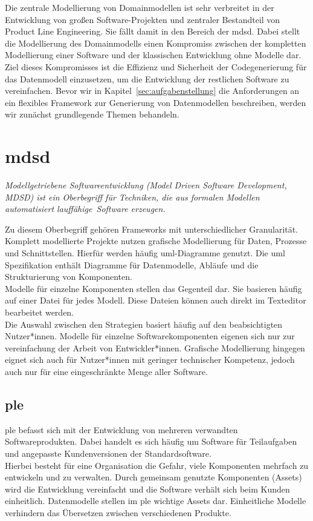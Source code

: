\documentclass[./einleitung.tex]{subfiles}
\begin{document}
Die zentrale Modellierung von Domainmodellen ist sehr verbreitet in der Entwicklung von großen Software-Projekten und zentraler Bestandteil von Product Line Engineering.
Sie fällt damit in den Bereich der \acrfull{mdsd}.
Dabei stellt die Modellierung des Domainmodells einen Kompromiss zwischen der kompletten Modellierung einer Software und der klassischen Entwicklung ohne Modelle dar. \\
Ziel dieses Kompromisses ist die Effizienz und Sicherheit der Codegenerierung für das Datenmodell einzusetzen, um die Entwicklung der restlichen Software zu vereinfachen.
Bevor wir in Kapitel~\ref{sec:aufgabenstellung} die Anforderungen an ein flexibles Framework zur Generierung von Datenmodellen beschreiben, werden wir zunächst grundlegende Themen behandeln.
\section{\acrfull{mdsd}}\label{subsec:mdsd}
\begin{center}
    \textit{Modellgetriebene Softwareentwicklung (Model Driven Software Development, MDSD) ist ein Oberbegriff für Techniken, die aus formalen Modellen automatisiert lauffähige~Software erzeugen.} \cite[p. 11]{modellbuch}
\end{center}
Zu diesem Oberbegriff gehören Frameworks mit unterschiedlicher Granularität.
Komplett modellierte Projekte nutzen grafische Modellierung für Daten, Prozesse und Schnittstellen.
Hierfür werden häufig \acrshort{uml}-Diagramme genutzt.
Die \acrshort{uml} Spezifikation enthält Diagramme für Datenmodelle, Abläufe und die Strukturierung von Komponenten.\\
Modelle für einzelne Komponenten stellen das Gegenteil dar.
Sie basieren häufig auf einer Datei für jedes Modell.
Diese Dateien können auch direkt im Texteditor bearbeitet werden.\\
Die Auswahl zwischen den Strategien basiert häufig auf den beabsichtigten Nutzer*innen.
Modelle für einzelne Softwarekomponenten eigenen sich nur zur vereinfachung der Arbeit von Entwickler*innen.
Grafische Modellierung hingegen eignet sich auch für Nutzer*innen mit geringer technischer Kompetenz, jedoch auch nur für eine eingeschränkte Menge aller Software.

\subsection{\acrfull{ple}}\label{subsec:ple}
\acrshort{ple} befasst sich mit der Entwicklung von mehreren verwandten Softwareprodukten.
Dabei handelt es sich häufig um Software für Teilaufgaben und angepasste Kundenversionen der Standardsoftware. \\
Hierbei besteht für eine Organisation die Gefahr, viele Komponenten mehrfach zu entwickeln und zu verwalten.
Durch gemeinsam genutzte Komponenten (Assets) wird die Entwicklung vereinfacht und die Software verhält sich beim Kunden einheitlich.
Datenmodelle stellen im \acrshort{ple} wichtige Assets dar.
Einheitliche Modelle verhindern das Übersetzen zwischen verschiedenen Produkte.
\end{document}
